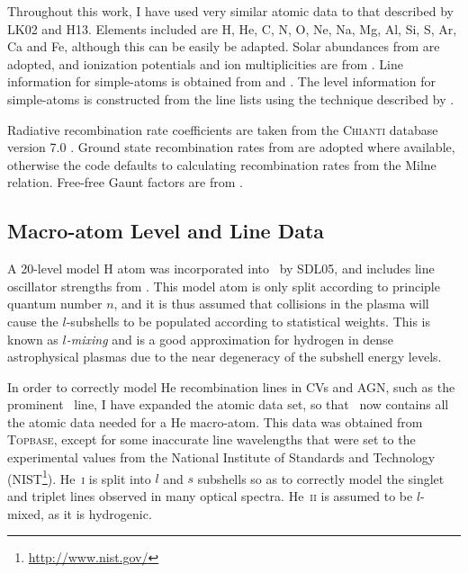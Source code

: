 Throughout this work, I have used very similar atomic data to that described 
by LK02 and H13. Elements included are H, He, C, N, O, Ne, Na, Mg, Al, Si, S,
Ar, Ca and Fe, although this can be easily be adapted. Solar abundances from
\cite{vernerbarthel1994} are adopted, and ionization potentials and ion
multiplicities are from \cite{verner1996}. Line information for simple-atoms 
is obtained from \citet[][$\sim5,000$ lines]{verner1996} 
and \citet[][$\sim55,000$ lines]{kurucz1995}. 
The level information for simple-atoms is constructed 
from the line lists using the technique described by \cite{lucy1999sne}.

Radiative recombination rate coefficients are taken from 
the \textsc{Chianti} database version 7.0 \citep{dere1997,landi2012}.
Ground state recombination rates from \cite{badnell2006} are adopted where available,
otherwise the code defaults to calculating recombination rates from the Milne
relation. Free-free Gaunt factors are from \cite{sutherland1998}.


\subsection{Macro-atom Level and Line Data}

A 20-level model H atom was incorporated into \py\ by SDL05,
and includes line oscillator strengths from \cite{menzel1935}.
This model atom is only split according to principle quantum number $n$,
and it is thus assumed that collisions in the plasma will cause 
the $l$-subshells to be populated according to statistical weights. 
This is known as {\em $l$-mixing} and is a good approximation for hydrogen in
dense astrophysical plasmas due to the near degeneracy of the subshell 
energy levels.

In order to correctly model He recombination lines in CVs and AGN, such as the 
prominent \heiiuv\ line, I have expanded the atomic data set, so that \py\
now contains all the atomic data needed for a He macro-atom. This data was 
obtained from \textsc{Topbase}, except for some inaccurate line wavelengths
that were set to the experimental values from the National 
Institute of Standards and Technology (NIST\footnote{\url{http://www.nist.gov/}}).
He~\textsc{i} is split into $l$ and $s$ subshells so as to correctly model the
singlet and triplet lines observed in many optical spectra. He~\textsc{ii} is assumed
to be $l$-mixed, as it is hydrogenic.

